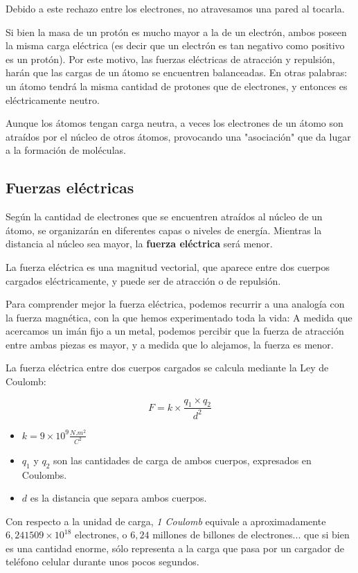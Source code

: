 Debido a este rechazo entre los electrones, no atravesamos una pared al tocarla.

Si bien la masa de un protón es mucho mayor a la de un electrón, ambos poseen la misma carga eléctrica (es decir que un electrón es tan negativo como positivo es un protón). Por este motivo, las fuerzas eléctricas de atracción y repulsión, harán que las cargas de un átomo se encuentren balanceadas. En otras palabras: un átomo tendrá la misma cantidad de protones que de electrones, y entonces es eléctricamente neutro.

Aunque los átomos tengan carga neutra, a veces los electrones de un átomo son atraídos por el núcleo de otros átomos, provocando una "asociación" que da lugar a la formación de moléculas.

\subsection{Fuerzas eléctricas}

Según la cantidad de electrones que se encuentren atraídos al núcleo de un átomo, se organizarán en diferentes capas o niveles de energía. Mientras la distancia al núcleo sea mayor, la \textbf{fuerza eléctrica} será menor.

La fuerza eléctrica es una magnitud vectorial, que aparece entre dos cuerpos cargados eléctricamente, y puede ser de atracción o de repulsión.

Para comprender mejor la fuerza eléctrica, podemos recurrir a una analogía con la fuerza magnética, con la que hemos experimentado toda la vida: 
A medida que acercamos un imán fijo a un metal, podemos percibir que la fuerza de atracción entre ambas piezas es mayor, y a medida que lo alejamos, la fuerza es menor.

La fuerza eléctrica entre dos cuerpos cargados se calcula mediante la Ley de Coulomb:

$$ F = k \times \frac{q_1 \times q_2}{d^{2}} $$

\begin{itemize}
	\item $k=9 \times 10^{9}\frac{N.m^{2}}{C^{2}}$
	\item $q_1$ y $q_2$ son las cantidades de carga de ambos cuerpos, expresados en Coulombs.
	\item $d$ es la distancia que separa ambos cuerpos.
\end{itemize}

Con respecto a la unidad de carga, \textit{1 Coulomb} equivale a aproximadamente $6,241509\times 10^{18}$ electrones, o $6,24$ millones de billones de electrones... que si bien es una cantidad enorme, sólo representa a la carga que pasa por un cargador de teléfono celular durante unos pocos segundos.

